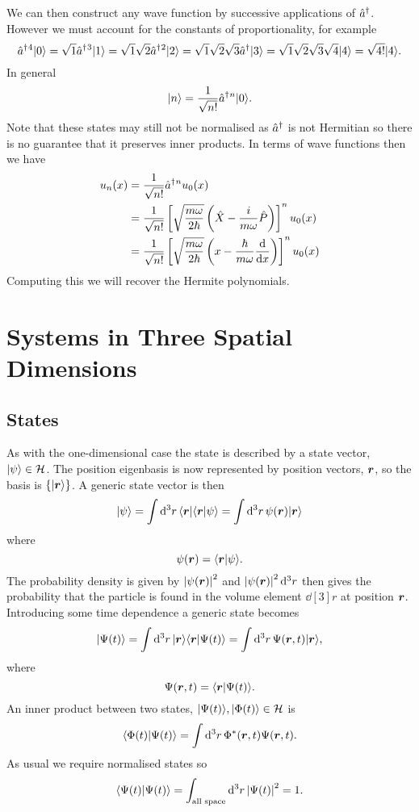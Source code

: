     We can then construct any wave function by successive applications of \(\hat{a}^\dagger\).
    However we must account for the constants of proportionality, for example
    \[\hat{a}^\dagger{^4}\vert {0} \rangle = \sqrt{1}\hat{a}^\dagger{^3}\vert {1} \rangle = \sqrt{1}\sqrt{2}\hat{a}^\dagger{^2}\vert {2} \rangle = \sqrt{1}\sqrt{2}\sqrt{3}\hat{a}^\dagger\vert {3} \rangle = \sqrt{1}\sqrt{2}\sqrt{3}\sqrt{4}\vert {4} \rangle = \sqrt{4!}\vert {4} \rangle.\]
    In general
    \[\vert {n} \rangle = \frac{1}{\sqrt{n!}}\hat{a}^\dagger{^n}\vert {0} \rangle.\]
    Note that these states may still not be normalised as \(\hat{a}^\dagger\) is not Hermitian so there is no guarantee that it preserves inner products.
    In terms of wave functions then we have
    \begin{align*}
        u_n(x) &= \frac{1}{\sqrt{n!}}\hat{a}^\dagger{^n}u_0(x)\\
        &= \frac{1}{\sqrt{n!}}\left[\sqrt{\frac{m\omega}{2\hbar}} \left(\hat{X} - \frac{i}{m\omega}\hat{P}\right)\right]^nu_0(x)\\
        &= \frac{1}{\sqrt{n!}}\left[\sqrt{\frac{m\omega}{2\hbar}} \left(x - \frac{\hbar}{m\omega}\dv{x}\right)\right]^nu_0(x)\\
    \end{align*}
    Computing this we will recover the Hermite polynomials.
    
    \section{Systems in Three Spatial Dimensions}
    \subsection{States}
    As with the one-dimensional case the state is described by a state vector, \(\vert {\psi} \rangle\in\mathcal{H}\).
    The position eigenbasis is now represented by position vectors, \(\bm{r}\), so the basis is \(\{\vert {\bm{r}} \rangle\}\).
    A generic state vector is then
    \[\vert {\psi} \rangle = \int\dd[3]{r}\langle {\bm{r}} \vert\langle {\bm{r}} \vert {\psi} \rangle = \int \dd[3]{r} \psi(\bm{r})\vert {\bm{r}} \rangle\]
    where
    \[\psi(\bm{r}) = \langle {\bm{r}} \vert {\psi} \rangle.\]
    The probability density is given by \(\abs{\psi(\bm{r})}^2\) and \(\abs{\psi(\bm{r})}^2\dd[3]{r}\) then gives the probability that the particle is found in the volume element \(\dd[3]{r}\) at position \(\bm{r}\).
    Introducing some time dependence a generic state becomes
    \[\vert {\Psi(t)} \rangle = \int \dd[3]{r} \vert {\bm{r}} \rangle\langle {\bm{r}} \vert {\Psi(t)} \rangle = \int \dd[3]{r} \Psi(\bm{r}, t)\vert {\bm{r}} \rangle,\]
    where
    \[\Psi(\bm{r}, t) = \langle {\bm{r}} \vert {\Psi(t)} \rangle.\]
    An inner product between two states, \(\vert {\Psi(t)} \rangle, \vert {\Phi(t)} \rangle\in\mathcal{H}\) is 
    \[\langle {\Phi(t)} \vert {\Psi(t)} \rangle = \int \dd[3]{r} \Phi^*(\bm{r}, t)\Psi(\bm{r}, t).\]
    As usual we require normalised states so
    \[\langle {\Psi(t)} \vert {\Psi(t)} \rangle = \int_{\text{all space}} \dd[3]{r}\abs{\Psi(t)}^2 = 1.\]
    
